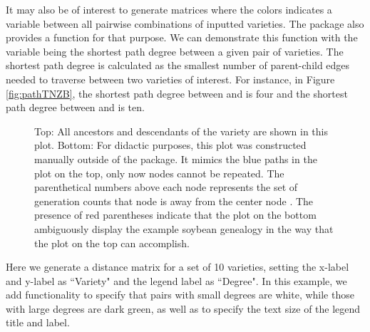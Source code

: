 \documentclass[article,shortnames]{jss}
\begin{document}
It may also be of interest to generate matrices where the colors indicates a variable between all pairwise combinations of inputted varieties. The package  also provides a function  for that purpose. We can demonstrate this function with the variable being the shortest path degree between a given pair of varieties. The shortest path degree is calculated as the smallest number of parent-child edges needed to traverse between two varieties of interest. For instance, in Figure \ref{fig:pathTNZB}, the shortest path degree between  and  is four and the shortest path degree between  and  is ten.

\begin{figure}[H]
    \centering
    \caption{Top: All ancestors and descendants of the variety  are shown in this  plot. Bottom: For didactic purposes, this plot was constructed manually outside of the  package. It mimics the blue paths in the  plot on the top, only now nodes cannot be repeated. The parenthetical numbers above each node represents the set of generation counts that node is away from the center node . The presence of red parentheses indicate that the plot on the bottom ambiguously display the example soybean genealogy in the way that the  plot on the top can accomplish.}
    \label{fig:Lee}
\end{figure}

Here we generate a distance matrix for a set of 10 varieties, setting the x-label and y-label as ``Variety" and the legend label as ``Degree". In this example, we add  functionality to specify that pairs with small degrees are white, while those with large degrees are dark green, as well as to specify the text size of the legend title and label.
\end{document}
